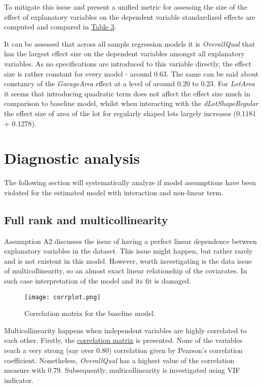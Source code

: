 \documentclass{article}
\begin{document}
To mitigate this issue and present a unified metric for assessing the size of the effect of explanatory variables on the dependent variable standardized effects are computed and compared in \hyperref[tab:standardizedeffects]{Table 3}. 

It can be assessed that across all sample regression models it is \emph{OverallQual} that has the largest effect size on the dependent variables amongst all explanatory variables. As no specifications are introduced to this variable directly, the effect size is rather constant for every model - around 0.63. The same can be said about constancy of the \emph{GarageArea} effect at a level of around 0.20 to 0.23. For \emph{LotArea} it seems that introducing quadratic term does not affect the effect size much in comparison to baseline model, whilst when interacting with the \emph{dLotShapeRegular} the effect size of area of the lot for regularly shaped lots largely increases (0.1181 + 0.1278).

\section{Diagnostic analysis}

The following section will systematically analyze if model assumptions have been violated for the estimated model with interaction and non-linear term. 

\subsection{Full rank and multicollinearity}

Assumption A2 discusses the issue of having a perfect linear dependence between explanatory variables in the dataset. This issue might happen, but rather rarely and is not existent in this model. However, worth investigating is the data issue of multicollinearity, so an almost exact linear relationship of the coviarates. In such case interpretation of the model and its fit is damaged.

\begin{figure}[htp]
    \caption{Correlation matrix for the baseline model.}
    \centering
    \texttt{[image: corrplot.png]}
    \label{fig:correlationmatrix}
\end{figure}

Multicollinearity happens when independent variables are highly correlated to each other. Firstly, the \hyperref[fig:correlationmatrix]{correlation matrix} is presented. None of the variables reach a very strong (say over 0.80) correlation given by Pearson's correlation coefficient. Nonetheless, \emph{OverallQual} has a highest value of the correlation measure with 0.79. Subsequently, multicollinearity is investigated using VIF indicator.
\end{document}
